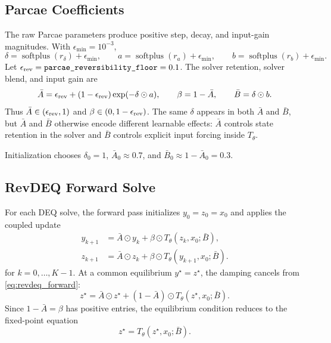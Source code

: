 \documentclass[11pt]{article}
\begin{document}
\subsection{Parcae Coefficients}
\label{sec:parcae_params}

The raw Parcae parameters produce positive step, decay, and input-gain
magnitudes.  With $\epsilon_{\min}=10^{-3}$,
\[
  \delta = \operatorname{softplus}(r_\delta)+\epsilon_{\min},
  \qquad
  a = \operatorname{softplus}(r_a)+\epsilon_{\min},
  \qquad
  b = \operatorname{softplus}(r_b)+\epsilon_{\min}.
\]
Let $\epsilon_{\rm rev}=\texttt{parcae\_reversibility\_floor}=0.1$.  The
solver retention, solver blend, and input gain are
\begin{equation}
  \bar A
    = \epsilon_{\rm rev}
      +(1-\epsilon_{\rm rev})\exp(-\delta\odot a),
  \qquad
  \beta = 1-\bar A,
  \qquad
  \bar B = \delta\odot b.
  \label{eq:parcae}
\end{equation}
Thus $\bar A\in(\epsilon_{\rm rev},1)$ and $\beta\in(0,1-\epsilon_{\rm rev})$.
The same $\delta$ appears in both $\bar A$ and $\bar B$, but $\bar A$ and
$\bar B$ otherwise encode different learnable effects: $\bar A$ controls
state retention in the solver and $\bar B$ controls explicit input forcing
inside $T_\theta$.

Initialization chooses $\delta_0=1$, $\bar A_0\approx0.7$, and
$\bar B_0\approx1-\bar A_0=0.3$.

\subsection{RevDEQ Forward Solve}
\label{sec:revdeq_forward}

For each DEQ solve, the forward pass initializes $y_0=z_0=x_0$ and applies
the coupled update
\begin{equation}
\begin{aligned}
  y_{k+1} &= \bar A\odot y_k
          + \beta\odot T_\theta(z_k,x_0;\bar B),\\
  z_{k+1} &= \bar A\odot z_k
          + \beta\odot T_\theta(y_{k+1},x_0;\bar B).
\end{aligned}
\label{eq:revdeq_forward}
\end{equation}
for $k=0,\ldots,K-1$.  At a common equilibrium $y^\star=z^\star$, the damping
cancels from \eqref{eq:revdeq_forward}:
\[
  z^\star = \bar A\odot z^\star
          + (1-\bar A)\odot T_\theta(z^\star,x_0;\bar B).
\]
Since $1-\bar A=\beta$ has positive entries, the equilibrium condition reduces
to the fixed-point equation
\[
  z^\star = T_\theta(z^\star,x_0;\bar B).
\]
\end{document}
